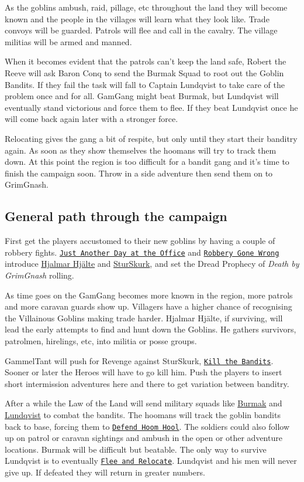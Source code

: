 As the goblins ambush, raid, pillage, etc throughout the land they will become known and the people in the villages will learn what they look like. Trade convoys will be guarded. Patrols will flee and call in the cavalry. The village militias will be armed and manned.

When it becomes evident that the patrols can't keep the land safe, Robert the Reeve will ask Baron Conq to send the Burmak Squad to root out the Goblin Bandits. If they fail the task will fall to Captain Lundqvist to take care of the problem once and for all. GamGang might beat Burmak, but Lundqvist will eventually stand victorious and force them to flee. If they beat Lundqvist once he will come back again later with a stronger force.

Relocating gives the gang a bit of respite, but only until they start their banditry again. As soon as they show themselves the hoomans will try to track them down. At this point the region is too difficult for a bandit gang and it's time to finish the campaign soon. Throw in a side adventure then send them on to GrimGnash.


\subsection*{General path through the campaign}

First get the players accustomed to their new goblins by having a couple of robbery fights. \hyperref[00justanotherdayattheoffice]{\texttt{Just Another Day at the Office}} and \hyperref[01robberygonewrong]{\texttt{Robbery Gone Wrong}} introduce \hyperref[hjalmarhjalte]{Hjalmar Hjälte} and \hyperref[sturskurkboss]{SturSkurk}, and set the Dread Prophecy of \emph{Death by GrimGnash} rolling.

As time goes on the GamGang becomes more known in the region, more patrols and more caravan guards show up. Villagers have a higher chance of recognising the Villainous Goblins making trade harder. Hjalmar Hjälte, if surviving, will lead the early attempts to find and hunt down the Goblins. He gathers survivors, patrolmen, hirelings, etc, into militia or posse groups.

GammelTant will push for Revenge against SturSkurk, \hyperref[02killthebandits]{\texttt{Kill the Bandits}}. Sooner or later the Heroes will have to go kill him. Push the players to insert short intermission adventures here and there to get variation between banditry.

After a while the Law of the Land will send military squads like \hyperref[appendixburmak]{Burmak} and \hyperref[appendixlundqvist]{Lundqvist} to combat the bandits. The hoomans will track the goblin bandits back to base, forcing them to \hyperref[03defendhoomhool]{\texttt{Defend Hoom Hool}}. The soldiers could also follow up on patrol or caravan sightings and ambush in the open or other adventure locations. Burmak will be difficult but beatable. The only way to survive Lundqvist is to eventually \hyperref[04fleeandrelocate]{\texttt{Flee and Relocate}}. Lundqvist and his men will never give up. If defeated they will return in greater numbers.

